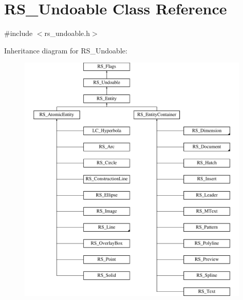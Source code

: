 \hypertarget{classRS__Undoable}{\section{R\-S\-\_\-\-Undoable Class Reference}
\label{classRS__Undoable}
}


{\ttfamily \#include $<$rs\-\_\-undoable.\-h$>$}

Inheritance diagram for R\-S\-\_\-\-Undoable\-:\begin{figure}[H]
\begin{center}
\leavevmode
\includegraphics[height=12.000000cm]{classRS__Undoable}
\end{center}
\end{figure}
